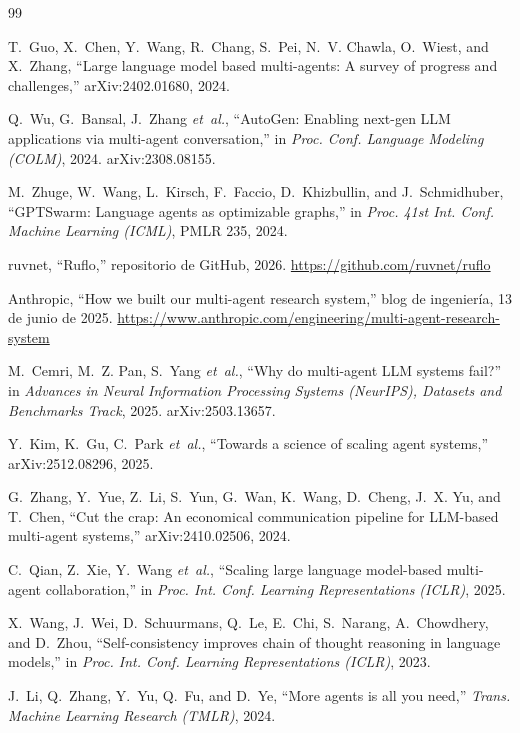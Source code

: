 \documentclass[conference]{IEEEtran}
\begin{document}
\begin{thebibliography}{99}

T.~Guo, X.~Chen, Y.~Wang, R.~Chang, S.~Pei, N.~V. Chawla, O.~Wiest, and X.~Zhang, ``Large language model based multi-agents: A survey of progress and challenges,'' arXiv:2402.01680, 2024.

Q.~Wu, G.~Bansal, J.~Zhang \emph{et~al.}, ``AutoGen: Enabling next-gen LLM applications via multi-agent conversation,'' in \emph{Proc. Conf. Language Modeling (COLM)}, 2024. arXiv:2308.08155.

M.~Zhuge, W.~Wang, L.~Kirsch, F.~Faccio, D.~Khizbullin, and J.~Schmidhuber, ``GPTSwarm: Language agents as optimizable graphs,'' in \emph{Proc. 41st Int. Conf. Machine Learning (ICML)}, PMLR 235, 2024.

ruvnet, ``Ruflo,'' repositorio de GitHub, 2026. \url{https://github.com/ruvnet/ruflo}

Anthropic, ``How we built our multi-agent research system,'' blog de ingeniería, 13 de junio de 2025. \url{https://www.anthropic.com/engineering/multi-agent-research-system}

M.~Cemri, M.~Z. Pan, S.~Yang \emph{et~al.}, ``Why do multi-agent LLM systems fail?'' in \emph{Advances in Neural Information Processing Systems (NeurIPS), Datasets and Benchmarks Track}, 2025. arXiv:2503.13657.

Y.~Kim, K.~Gu, C.~Park \emph{et~al.}, ``Towards a science of scaling agent systems,'' arXiv:2512.08296, 2025.

G.~Zhang, Y.~Yue, Z.~Li, S.~Yun, G.~Wan, K.~Wang, D.~Cheng, J.~X. Yu, and T.~Chen, ``Cut the crap: An economical communication pipeline for LLM-based multi-agent systems,'' arXiv:2410.02506, 2024.

C.~Qian, Z.~Xie, Y.~Wang \emph{et~al.}, ``Scaling large language model-based multi-agent collaboration,'' in \emph{Proc. Int. Conf. Learning Representations (ICLR)}, 2025.

X.~Wang, J.~Wei, D.~Schuurmans, Q.~Le, E.~Chi, S.~Narang, A.~Chowdhery, and D.~Zhou, ``Self-consistency improves chain of thought reasoning in language models,'' in \emph{Proc. Int. Conf. Learning Representations (ICLR)}, 2023.

J.~Li, Q.~Zhang, Y.~Yu, Q.~Fu, and D.~Ye, ``More agents is all you need,'' \emph{Trans. Machine Learning Research (TMLR)}, 2024.


\end{thebibliography}
\end{document}

